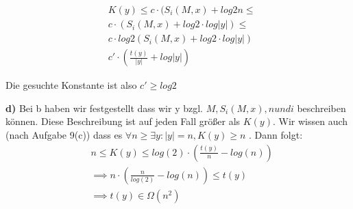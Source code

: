 \documentclass{article}
\begin{document}
\begin{align*} 
	&K(y) \leq c  \cdot (S_i(M,x) + log 2n \leq  \\
	&c \cdot ( S_i(M,x) + log 2 \cdot log |y| ) \leq \\
	& c \cdot log 2( S_i(M,x) + log 2 \cdot log |y|) \\
	& c' \cdot  ( \frac{t(y)}{|y|} + log |y|)
\end{align*}

Die gesuchte Konstante ist also $c' \geq log 2$

\vspace{10px}
\textbf{d)} Bei b haben wir festgestellt dass wir y bzgl. $M , S_i(M,x)  ,n und i$ beschreiben können. Diese Beschreibung ist auf jeden Fall größer als $K(y)$. Wir wissen auch (nach Aufgabe 9(c)) dass es $\forall n \geq \exists y : |y| = n , K(y) \geq n$ . Dann folgt:
\begin{align*} 
	& n \leq K(y) \leq  log(2) \cdot( \frac{t(y)}{n} - log(n))  \\
	& \implies n \cdot ( \frac{n}{log(2)} - log(n)) \leq t(y) \\
	& \implies t(y) \in \Omega(n^2)
\end{align*}
\end{document}
